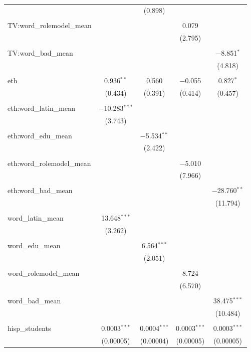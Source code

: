\begin{table}[!htbp]
\begin{tabular}{@{\extracolsep{-2pt}}lcccc}
  &  & (0.898) &  &  \\ 
  & & & & \\ 
 TV:word\_rolemodel\_mean &  &  & 0.079 &  \\ 
  &  &  & (2.795) &  \\ 
  & & & & \\ 
 TV:word\_bad\_mean &  &  &  & $-$8.851$^{*}$ \\ 
  &  &  &  & (4.818) \\ 
  & & & & \\ 
 eth & 0.936$^{**}$ & 0.560 & $-$0.055 & 0.827$^{*}$ \\ 
  & (0.434) & (0.391) & (0.414) & (0.457) \\ 
  & & & & \\ 
 eth:word\_latin\_mean & $-$10.283$^{***}$ &  &  &  \\ 
  & (3.743) &  &  &  \\ 
  & & & & \\ 
 eth:word\_edu\_mean &  & $-$5.534$^{**}$ &  &  \\ 
  &  & (2.422) &  &  \\ 
  & & & & \\ 
 eth:word\_rolemodel\_mean &  &  & $-$5.010 &  \\ 
  &  &  & (7.966) &  \\ 
  & & & & \\ 
 eth:word\_bad\_mean &  &  &  & $-$28.760$^{**}$ \\ 
  &  &  &  & (11.794) \\ 
  & & & & \\ 
 word\_latin\_mean & 13.648$^{***}$ &  &  &  \\ 
  & (3.262) &  &  &  \\ 
  & & & & \\ 
 word\_edu\_mean &  & 6.564$^{***}$ &  &  \\ 
  &  & (2.051) &  &  \\ 
  & & & & \\ 
 word\_rolemodel\_mean &  &  & 8.724 &  \\ 
  &  &  & (6.570) &  \\ 
  & & & & \\ 
 word\_bad\_mean &  &  &  & 38.475$^{***}$ \\ 
  &  &  &  & (10.484) \\ 
  & & & & \\ 
 hisp\_students & 0.0003$^{***}$ & 0.0004$^{***}$ & 0.0003$^{***}$ & 0.0003$^{***}$ \\ 
  & (0.00005) & (0.00004) & (0.00005) & (0.00005) \\ 

\end{tabular}
\end{table}
